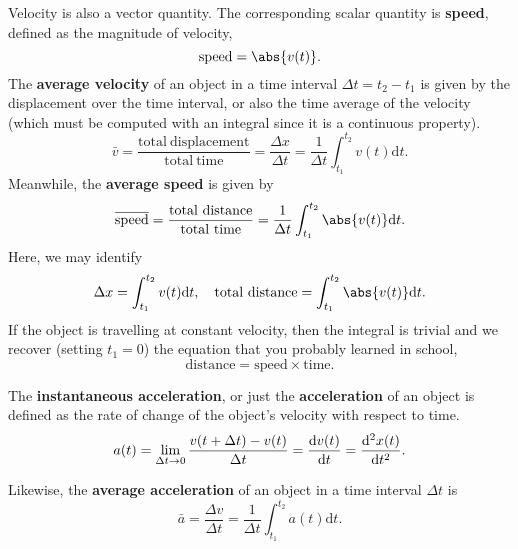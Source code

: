 \documentclass[../classical_mechanics.tex]{subfiles}
\begin{document}
        Velocity is also a vector quantity.
        The corresponding scalar quantity is \textbf{speed}, defined as the magnitude of velocity,
        \begin{equation}
            \mathrm{speed}=\abs{v(t)}.
        \end{equation}
        The \textbf{average velocity} of an object in a time interval $\Delta t=t_2-t_1$ is given by the displacement over the time interval, or also the time average of the velocity (which must be computed with an integral since it is a continuous property).
        \begin{equation}
            \bar{v}=\frac{\mathrm{total\ displacement}}{\mathrm{total\ time}}=\frac{\Delta x}{\Delta t}=\frac{1}{\Delta t}\int_{t_1}^{t_2}v(t)\mathrm{d}t.
        \end{equation}
        Meanwhile, the \textbf{average speed} is given by
        \begin{equation}
            \overline{\mathrm{speed}}=\frac{\mathrm{total\ distance}}{\mathrm{total\ time}}=\frac{1}{\Delta t}\int_{t_1}^{t_2}\abs{v(t)}\mathrm{d}t.
        \end{equation}
        Here, we may identify
        \begin{equation}\label{tot-disp}
            \Delta x=\int_{t_1}^{t_2}v(t)\mathrm{d}t,\quad \mathrm{total\ distance}=\int_{t_1}^{t_2}\abs{v(t)}\mathrm{d}t.
        \end{equation}
        If the object is travelling at constant velocity, then the integral is trivial and we recover (setting $t_1=0$) the equation that you probably learned in school,
        \begin{equation}
            \mathrm{distance}=\mathrm{speed}\times\mathrm{time}.
        \end{equation}
        \begin{definition}
            The \textbf{instantaneous acceleration}, or just the \textbf{acceleration} of an object is defined as the rate of change of the object's velocity with respect to time.
            \begin{equation}
                a(t)=\lim_{\Delta t\to0}\frac{v(t+\Delta t)-v(t)}{\Delta t}=\dv{v(t)}{t}=\dv[2]{x(t)}{t}.
            \end{equation}
        \end{definition}
        Likewise, the \textbf{average acceleration} of an object in a time interval $\Delta t$ is
        \begin{equation}\label{av-acc}
            \bar{a}=\frac{\Delta v}{\Delta t}=\frac{1}{\Delta t}\int_{t_1}^{t_2}a(t)\mathrm{d}t.
        \end{equation}
\end{document}
